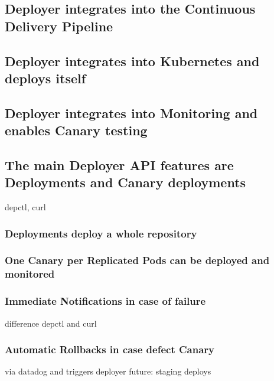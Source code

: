 \subsection{Deployer integrates into the Continuous Delivery Pipeline}
\subsection{Deployer integrates into Kubernetes and deploys itself}
\subsection{Deployer integrates into Monitoring and enables Canary testing}
\subsection{The main Deployer API features are Deployments and Canary deployments}
depctl, curl
\subsubsection{Deployments deploy a whole repository}
\subsubsection{One Canary per Replicated Pods can be deployed and monitored}
\subsubsection{Immediate Notifications in case of failure}
difference depctl and curl
\subsubsection{Automatic Rollbacks in case defect Canary}
via datadog and triggers deployer
future: staging deploys




